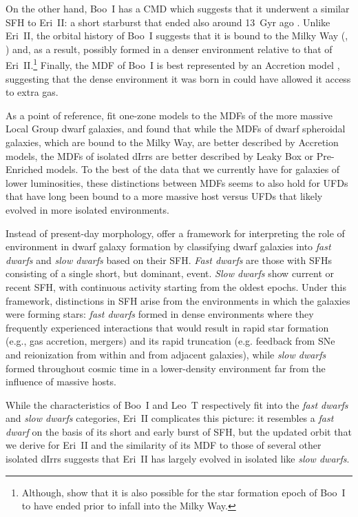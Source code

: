 \documentclass[twocolumn]{aastex63}
\begin{document}
\par On the other hand, Boo~I has a CMD which suggests that it underwent a similar SFH to Eri~II: a short starburst that ended also around 13~Gyr ago \citep{brown2014sfh}. Unlike Eri~II, the orbital history of Boo~I suggests that it is bound to the Milky Way (\citealt{simon2018}, \citealt{fritz2018}) and, as a result, possibly formed in a denser environment relative to that of Eri~II.\footnote{Although, \citet{fillingham2019} show that it is also possible for the star formation epoch of Boo~I to have ended prior to infall into the Milky Way.} Finally, the MDF of Boo~I is best represented by an Accretion model \citep{jenkins2021vlt}, suggesting that the dense environment it was born in could have allowed it access to extra gas. 


\par As a point of reference, \citet{kirby2013LZR} fit one-zone models to the MDFs of the more massive Local Group dwarf galaxies, and found that while the MDFs of dwarf spheroidal galaxies, which are bound to the Milky Way, are better described by Accretion models, the MDFs of isolated dIrrs are better described by Leaky Box or Pre-Enriched models. To the best of the data that we currently have for galaxies of lower luminosities, these distinctions between MDFs seems to also hold for UFDs that have long been bound to a more massive host versus UFDs that likely evolved in more isolated environments. 

\par Instead of present-day morphology, \citet{gallart2015} offer a framework for interpreting the role of environment in dwarf galaxy formation by classifying dwarf galaxies into \textit{fast dwarfs} and \textit{slow dwarfs} based on their SFH. \textit{Fast dwarfs} are those with SFHs consisting of a single short, but dominant, event. \textit{Slow dwarfs} show current or recent SFH, with continuous activity starting from the oldest epochs. Under this framework, distinctions in SFH arise from the environments in which the galaxies were forming stars: \textit{fast dwarfs} formed in dense environments where they frequently experienced interactions that would result in rapid star formation (e.g., gas accretion, mergers) and its rapid truncation (e.g. feedback from SNe and reionization from within and from adjacent galaxies), while \textit{slow dwarfs} formed throughout cosmic time in a lower-density environment far from the influence of massive hosts. 

\par While the characteristics of Boo~I and Leo~T respectively fit into the \textit{fast dwarfs} and \textit{slow dwarfs} categories, Eri~II complicates this picture: it resembles a \textit{fast dwarf} on the basis of its short and early burst of SFH, but the updated orbit that we derive for Eri~II and the similarity of its MDF to those of several other isolated dIrrs suggests that Eri~II has largely evolved in isolated like \textit{slow dwarfs}. 
\end{document}
